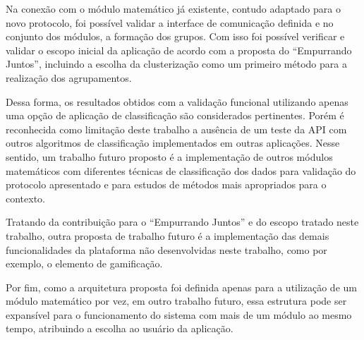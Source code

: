   Na conexão com o módulo matemático já existente, contudo adaptado para o novo protocolo, foi possível validar a interface de 
  comunicação definida e no conjunto dos módulos, a formação dos grupos. Com isso foi possível verificar e validar o escopo 
  inicial da aplicação de acordo com a proposta do ``Empurrando Juntos'', incluindo a escolha da clusterização 
  como um primeiro método para a realização dos agrupamentos. 
  
  Dessa forma, os resultados obtidos com a validação funcional utilizando apenas uma opção de aplicação de classificação são considerados pertinentes.
  Porém é reconhecida como limitação deste trabalho a ausência de um teste da API com outros algoritmos de classificação implementados em outras aplicações.
  Nesse sentido, um trabalho futuro proposto é a implementação de outros módulos matemáticos com diferentes técnicas
  de classificação dos dados para validação do protocolo apresentado e para estudos de métodos mais apropriados para o contexto.
  
  Tratando da contribuição para o ``Empurrando Juntos'' e do escopo tratado neste trabalho, outra proposta de trabalho futuro é a 
  implementação das demais funcionalidades da plataforma não desenvolvidas neste trabalho,
  como por exemplo, o elemento de gamificação.
  
  Por fim, como a arquitetura proposta foi definida apenas para a utilização de um módulo matemático por vez, em outro trabalho futuro, 
  essa estrutura pode ser expansível para o funcionamento do sistema com mais de um módulo ao mesmo tempo, atribuindo a escolha ao usuário da aplicação.
  